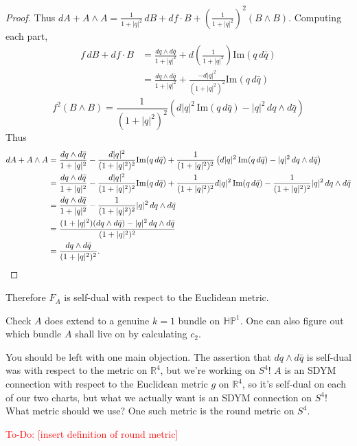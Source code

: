 \documentclass[main]{subfiles}
\begin{document}
\begin{proof}
Thus $dA+A\wedge A=\frac{1}{1+|q|^2}\,dB+df\cdot B+\left(\frac{1}{1+|q|^2}\right)^2(B\wedge B)$. Computing each part,
\begin{align*}
f\,dB+df\cdot B &= \frac{dq\wedge d\bar q}{1+|q|^2}+d\left(\frac{1}{1+|q|^2}\right)\mathrm{Im}(q\,d\bar q)\\
&= \frac{dq\wedge d\bar q}{1+|q|^2}+\frac{-d|q|^2}{(1+|q|^2)^2}\mathrm{Im}(q\,d\bar q)
\end{align*}
\[
f^2(B\wedge B) = \frac{1}{(1+|q|^2)^2}\left(d|q|^2\,\mathrm{Im}(q\,d\bar q)-|q|^2\,dq\wedge d\bar q\right)
\]
Thus
\begin{align*}
dA+A\wedge A &= \frac{dq\wedge d\bar q}{1+|q|^2}-\frac{d|q|^2}{(1+|q|^2)^2}\mathrm{Im}(q\,d\bar q)+\frac{1}{(1+|q|^2)^2}\left(d|q|^2\,\mathrm{Im}(q\,d\bar q)-|q|^2\,dq\wedge d\bar q\right)\\
&= \frac{dq\wedge d\bar q}{1+|q|^2}-\frac{d|q|^2}{(1+|q|^2)^2}\mathrm{Im}(q\,d\bar q)+\frac{1}{(1+|q|^2)^2}d|q|^2\,\mathrm{Im}(q\,d\bar q)-\frac{1}{(1+|q|^2)^2}|q|^2\,dq\wedge d\bar q\\
&= \frac{dq\wedge d\bar q}{1+|q|^2}-\frac{1}{(1+|q|^2)^2}|q|^2\,dq\wedge d\bar q\\
&= \frac{(1+|q|^2)(dq\wedge d\bar q)-|q|^2\,dq\wedge d\bar q}{(1+|q|^2)^2}\\
&= \frac{dq\wedge d\bar q}{(1+|q|^2)^2}. \qedhere
\end{align*}
\end{proof}

Therefore $F_A$ is self-dual with respect to the Euclidean metric.

\begin{exercise}
Check $A$ does extend to a genuine $k=1$ bundle on $\mathbb{HP}^1$. One can also figure out which bundle $A$ shall live on by calculating $c_2$.
\end{exercise}

You should be left with one main objection. The assertion that $dq\wedge d\bar q$ is self-dual was with respect to the metric on $\mathbb{R}^4$, but we're working on $S^4$! $A$ is an SDYM connection with respect to the Euclidean metric $g$ on $\mathbb{R}^4$, so it's self-dual on each of our two charts, but what we actually want is an SDYM connection on $S^4$! What metric should we use? One such metric is the round metric on $S^4$.

\begin{definition}
\textcolor{red}{To-Do: [insert definition of round metric]}
\end{definition}
\end{document}
